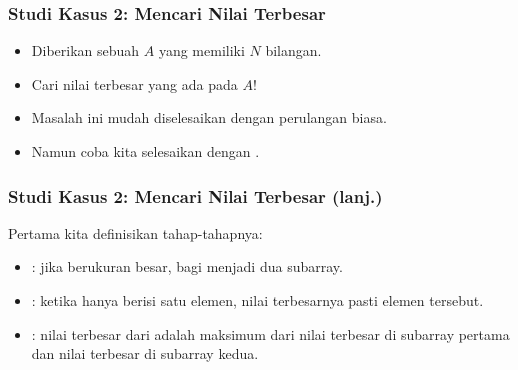 %
%
%
%

\begin{frame}
\frametitle{Studi Kasus 2: Mencari Nilai Terbesar}
\begin{itemize}
  \item Diberikan sebuah \farray $A$ yang memiliki $N$ bilangan.
  \item Cari nilai terbesar yang ada pada $A$!\newline
  \item Masalah ini mudah diselesaikan dengan perulangan biasa.
  \item Namun coba kita selesaikan dengan \fDivideAndConquer.\end{itemize}
\end{frame}

\begin{frame}
\frametitle{Studi Kasus 2: Mencari Nilai Terbesar (lanj.)}
Pertama kita definisikan tahap-tahapnya:
\begin{itemize}
  \item {}: jika \farray berukuran besar, bagi menjadi dua subarray.
  \item {}: ketika \farray hanya berisi satu elemen, nilai terbesarnya pasti elemen tersebut.
  \item {}: nilai terbesar dari \farray adalah maksimum dari nilai terbesar di subarray pertama dan nilai terbesar di subarray kedua.
\end{itemize}
\end{frame}

